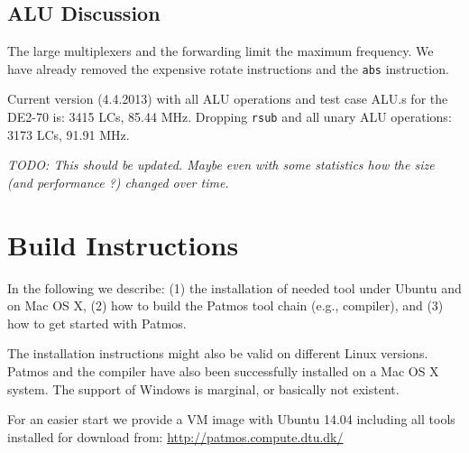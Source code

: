 \documentclass[a4paper,fontsize=10pt,twoside,DIV15,BCOR12mm,headinclude=true,footinclude=false,pagesize,bibtotoc]{scrbook}
\newcommand{\code}[1]{{\texttt{#1}}}
\newcommand{\todo}[1]{{\emph{TODO: #1}}}
\begin{document}
\section{ALU Discussion}

The large multiplexers and the forwarding limit the maximum frequency.
We have already removed the expensive rotate instructions and the
\code{abs} instruction.

Current version (4.4.2013) with all ALU operations and test case ALU.s
for the DE2-70 is: 3415 LCs, 85.44 MHz. Dropping \code{rsub} and all unary
ALU operations: 3173 LCs, 91.91 MHz.

\todo{This should be updated. Maybe even with some statistics how the size
(and performance ?) changed over time.}


\chapter{Build Instructions}
\label{ch:build_instructions}

In the following we describe: (1) the installation of needed tool under Ubuntu and
on Mac OS X, (2) how to build the Patmos tool chain (e.g., compiler), and (3) how
to get started with Patmos.

The installation instructions might also be valid on different Linux versions.
Patmos and the compiler have also been successfully installed on a Mac OS X
system.  The support of Windows is marginal, or basically not existent.

For an easier start we provide a VM image with Ubuntu 14.04 including
all tools installed for download from: \url{http://patmos.compute.dtu.dk/}
\end{document}
